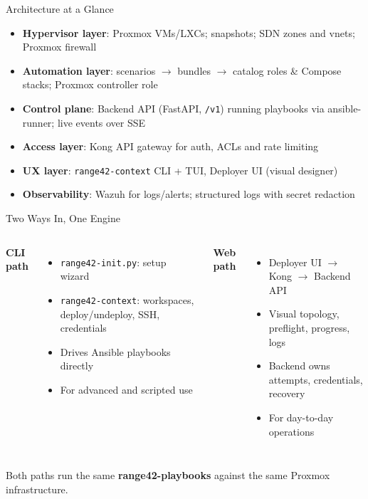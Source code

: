 \documentclass[aspectratio=169]{beamer}
\begin{document}
\begin{frame}[squeeze]{Architecture at a Glance}
  \begin{itemize}
    \item \textbf{Hypervisor layer}: Proxmox VMs/LXCs; snapshots; SDN zones and vnets; Proxmox firewall
    \item \textbf{Automation layer}: scenarios $\rightarrow$ bundles $\rightarrow$ catalog roles \& Compose stacks; Proxmox controller role
    \item \textbf{Control plane}: Backend API (FastAPI, \texttt{/v1}) running playbooks via ansible-runner; live events over SSE
    \item \textbf{Access layer}: Kong API gateway for auth, ACLs and rate limiting
    \item \textbf{UX layer}: \texttt{range42-context} CLI + TUI, Deployer UI (visual designer)
    \item \textbf{Observability}: Wazuh for logs/alerts; structured logs with secret redaction
  \end{itemize}
\end{frame}

\begin{frame}{Two Ways In, One Engine \; \faProjectDiagram}
  \begin{columns}[T]
    \textbf{\faTerminal\; CLI path}
    \begin{itemize}
      \item \texttt{range42-init.py}: setup wizard
      \item \texttt{range42-context}: workspaces, deploy/undeploy, SSH, credentials
      \item Drives Ansible playbooks directly
      \item For advanced and scripted use
    \end{itemize}

    \textbf{\faDesktop\; Web path}
    \begin{itemize}
      \item Deployer UI $\rightarrow$ Kong $\rightarrow$ Backend API
      \item Visual topology, preflight, progress, logs
      \item Backend owns attempts, credentials, recovery
      \item For day-to-day operations
    \end{itemize}
  \end{columns}
  \vspace{3mm}
  \begin{tcolorbox}
    \faInfoCircle\; Both paths run the same \textbf{range42-playbooks} against the same Proxmox infrastructure.
  \end{tcolorbox}
\end{frame}
\end{document}
